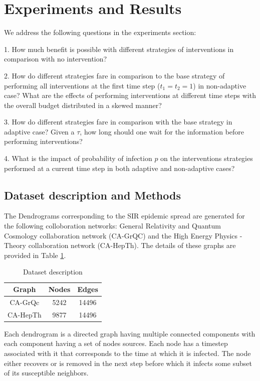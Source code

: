 
\section{Experiments and Results}
We address the following questions in the experiments section:

1. How much benefit is possible with different strategies of interventions in comparison with no intervention?

2. How do different strategies fare in comparison to the base strategy of performing all interventions at the first time step ($t_1 = t_2 = 1$) in non-adaptive case?
What are the effects of performing interventions at different time steps with the overall budget distributed in a skewed manner?

3. How do different strategies fare in comparison with the base strategy in adaptive case? Given a $\tau$, how long should one wait for the information before performing interventions? 

4. What is the impact of probability of infection $p$ on the interventions strategies performed at a current time step in both adaptive and non-adaptive cases?

\subsection{Dataset description and Methods}
The Dendrograms corresponding to the SIR epidemic spread are generated for the following colloboration networks: General Relativity and Quantum Cosmology collaboration network (CA-GrQC) and the High Energy Physics - Theory collaboration network (CA-HepTh). The details of these graphs are provided in Table \ref{tab:datasets}.
\begin{table}
\centering

\begin{tabular}{|c|c|c|}
\hline
    \textbf{Graph} &  \textbf{Nodes} & \textbf{Edges} \\
    \hline
    CA-GrQc & 5242 & 14496 \\
    CA-HepTh & 9877 & 14496 \\
\hline
\end{tabular}
\caption{Dataset description}
\label{tab:datasets}
\end{table}

Each dendrogram is a directed graph having multiple connected components with each component having a set of nodes sources. Each node has a timestep associated with it that corresponds to the time at which it is infected. The node either recovers or is removed in the next step before which it infects some subset of its susceptible neighbors.

